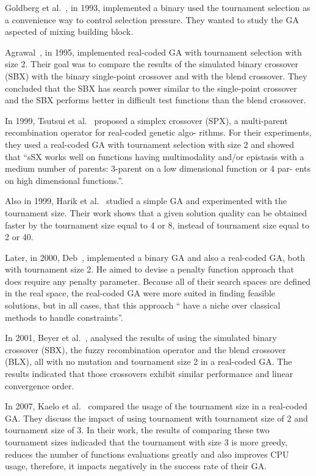 Goldberg et al.~\cite{goldberg1993toward}, in 1993, implemented a binary used the tournament selection as a convenience way to control selection pressure. They wanted to study the GA aspected of mixing building block.

Agrawal~\cite{agrawal1995simulated}, in 1995, implemented real-coded GA with tournament selection with size 2. Their goal was to compare the results of the simulated binary crossover (SBX) with the binary single-point crossover and with the blend crossover. They concluded that the SBX  has search power similar to the single-point crossover and the SBX performs better in difficult test functions than the blend crossover. 

In 1999, Tsutsui et al.~\cite{tsutsui1999multi} proposed a simplex crossover (SPX), a multi-parent recombination operator for real-coded genetic algo- rithms. For their experiments, they used a real-coded GA with tournament selection with size 2 and showed that ``sSX works well on functions having multimodality and/or epistasis with a medium number of parents: 3-parent on a low dimensional function or 4 par- ents on high dimensional functions.''.

Also in 1999, Harik et al.~\cite{harik1999compact} studied a simple GA and experimented with the tournament size. Their work shows that a given solution quality can be obtained faster by the tournament size equal to 4 or 8, instead of tournament size equal to 2 or 40.

Later, in 2000, Deb~\cite{deb2000efficient}, implemented a binary GA and also a real-coded GA, both with tournament size 2. He aimed to devise a penalty function approach that does require any penalty parameter. Because all of their search spaces are defined in the real space, the real-coded GA were more suited in finding feasible solutions, but in all cases, that this approach `` have a niche over classical methods to handle constraints''.


In 2001, Beyer et al.~\cite{beyer2001self}, analysed the results of using the simulated binary crossover (SBX), the fuzzy recombination operator and the blend crossover (BLX), all with no mutation and tournament size 2 in a real-coded GA. The results indicated that those crossovers exhibit similar performance and linear convergence order.


In 2007, Kaelo et al.~\cite{kaelo2007integrated} compared the usage of the tournament size in a real-coded GA. They discuss the impact of using tournament with tournament size of 2 and tournament size of 3. In their work, the results of comparing these two tournament sizes indicaded that the tournament with size 3 is more greedy, reduces the number of functions evaluations greatly and also improves CPU usage, therefore, it impacts negatively in the success rate of their GA.

